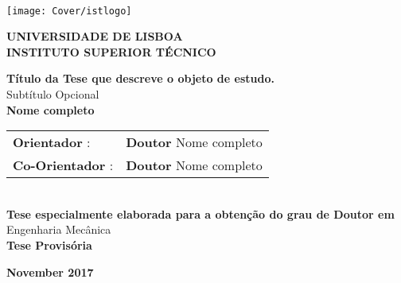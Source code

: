 \setcounter{page}{1} 


\thispagestyle{empty}
\begin{flushleft} ~\\ \vspace{-12mm} \hspace{-12mm}  \texttt{[image: Cover/istlogo]} 
 
\centering
\LARGE \textbf{UNIVERSIDADE DE LISBOA \\ INSTITUTO SUPERIOR TÉCNICO}
\vspace{30mm}

 \vspace{5mm}
 
\centering
\LARGE \textbf{Título da Tese que descreve o objeto de estudo.}
\\ \vspace{10mm}
\Large Subtítulo Opcional
\\ \vspace{15mm}
\Large \textbf{Nome completo} \\
\vspace{4cm}

\begin{minipage}{\textwidth}
\begin{tabularx}{\textwidth}{ l @{ } l }
\large \textbf{Orientador} : & \textbf{Doutor} Nome completo\\
 \large \textbf{Co-Orientador} :  & \textbf{Doutor} Nome completo\\
\end{tabularx}

\end{minipage}
%
\\ \vspace{27mm}
\centering
\large \textbf{Tese especialmente elaborada para a obtenção do grau de Doutor em}\\
\large Engenharia Mecânica\\
\vspace{18mm}
\Large \textbf{Tese Provisória}
 
\vspace{15mm}

\large \textbf{November 2017} \\
\let\thepage\relax
\end{flushleft}
\pagebreak
